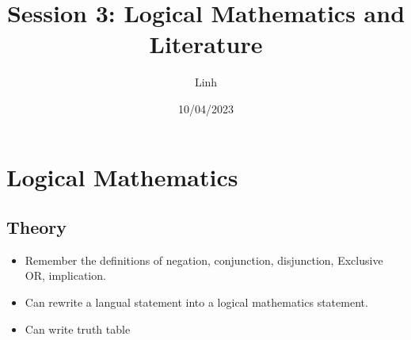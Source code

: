 \documentclass{article}
\title{Session 3: Logical Mathematics and Literature}
\author{Linh}
\date{10/04/2023}
\begin{document}
    \maketitle
    \section{Logical Mathematics}
    \subsection{Theory}
    \begin{itemize}
        \item Remember the definitions of negation, conjunction, disjunction, Exclusive OR, implication.
        \item Can rewrite a langual statement into a logical mathematics statement.
        \item Can write truth table
        \end{itemize}
\end{document}
